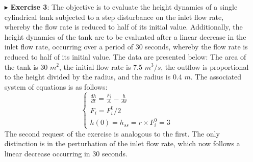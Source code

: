 \documentclass[xcolor={dvipsnames,rgb}, aspectratio=169]{beamer}
\begin{document}
\begin{frame}{}
   \begin{itemize}
      \item[$\blacktriangleright$] \textbf{Exercise 3}: \small{The objective is to
         evaluate the height dynamics of a single cylindrical tank subjected to a step
         disturbance on the inlet flow rate, whereby the flow rate is reduced to half of
         its initial value. Additionally, the height dynamics of the tank are to be
         evaluated after a linear decrease in the inlet flow rate, occurring over a
         period of 30 seconds, whereby the flow rate is reduced to half of its initial
         value. The data are presented below: The area of the tank is 30 $m^2$, the
         initial flow rate is 7.5 $m^3 / s$, the outflow is proportional to the height
         divided by the radius, and the radius is 0.4 $m$. The associated system of
         equations is as follows:}
         \begin{equation*}
            \begin{cases}
               \frac{dh}{dt} = \frac{F_{i}}{A} - \frac{h}{Ar} \\
               F_{i} = F_{i}^{0}/2 \\
               h(0) = h_{ss} = r \times F_{i}^{0} = 3
            \end{cases}
         \end{equation*}
         \small{The second request of the exercise is analogous to the first. The only
         distinction is in the perturbation of the inlet flow rate, which now follows a
         linear decrease occurring in 30 seconds.}
   \end{itemize}
\end{frame}
\end{document}
